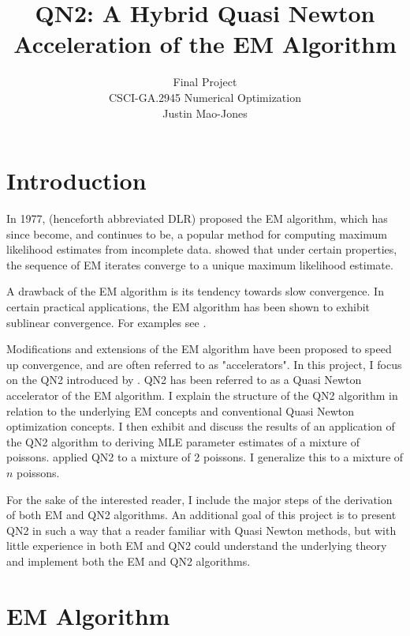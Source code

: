 \documentclass[letter,12pt]{article}
\begin{document}
\title{QN2: A Hybrid Quasi Newton Acceleration of the EM Algorithm}
\author{Final Project\\CSCI-GA.2945 Numerical Optimization\\Justin Mao-Jones}
\renewcommand{\today}{December 14, 2014}
\maketitle

\section{Introduction}

In 1977, \citeauthor*{dempsterlr77} (henceforth abbreviated DLR) proposed the EM algorithm, which has since become, and continues to be, a popular method for computing maximum likelihood estimates from incomplete data.  \cite{wu1983} showed that under certain properties, the sequence of EM iterates converge to a unique maximum likelihood estimate.

A drawback of the EM algorithm is its tendency towards slow convergence.  In certain practical applications, the EM algorithm has been shown to exhibit sublinear convergence.  For examples see \cite{lange1995a,jamshidianj93,jamshidianj97}.

Modifications and extensions of the EM algorithm have been proposed to speed up convergence, and are often referred to as "accelerators".  In this project, I focus on the QN2 introduced by \cite{jamshidianj97}.  QN2 has been referred to as a Quasi Newton accelerator of the EM algorithm.  I explain the structure of the QN2 algorithm in relation to the underlying EM concepts and conventional Quasi Newton optimization concepts.  I then exhibit and discuss the results of an application of the QN2 algorithm to deriving MLE parameter estimates of a mixture of poissons.  \cite{jamshidianj97} applied QN2 to a mixture of 2 poissons.  I generalize this to a mixture of $n$ poissons.

For the sake of the interested reader, I include the major steps of the derivation of both EM and QN2 algorithms.  An additional goal of this project is to present QN2 in such a way that a reader familiar with Quasi Newton methods, but with little experience in both EM and QN2 could understand the underlying theory and implement both the EM and QN2 algorithms.

\section{EM Algorithm}
\end{document}
